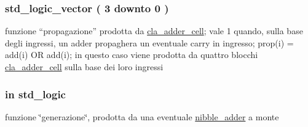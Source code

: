 \subsubsection[{\texorpdfstring{cla\+\_\+carry\+\_\+net}{cla_carry_net}}]{ {\bfseries \textcolor{vhdlchar}{ }} \hspace{0.3cm}{\ttfamily [Component]}}\hypertarget{group___nibble_adder_ga12bdc5892f526938e1447d663d152df8}{}\label{group___nibble_adder_ga12bdc5892f526938e1447d663d152df8}
\subsubsection[{\texorpdfstring{gen}{gen}}]{ {\bfseries \textcolor{vhdlchar}{std\+\_\+logic\+\_\+vector}\textcolor{vhdlchar}{ }\textcolor{vhdlchar}{(}\textcolor{vhdlchar}{ }\textcolor{vhdlchar}{ } \textcolor{vhdldigit}{3} \textcolor{vhdlchar}{ }\textcolor{vhdlchar}{downto}\textcolor{vhdlchar}{ }\textcolor{vhdlchar}{ } \textcolor{vhdldigit}{0} \textcolor{vhdlchar}{ }\textcolor{vhdlchar}{)}\textcolor{vhdlchar}{ }} \hspace{0.3cm}{\ttfamily [Signal]}}\hypertarget{group___nibble_adder_gac6c069fe4ec1c0a42272d3de4be6f45f}{}\label{group___nibble_adder_gac6c069fe4ec1c0a42272d3de4be6f45f}
funzione “propagazione” prodotta da \hyperlink{classcla__adder__cell}{cla\+\_\+adder\+\_\+cell}; vale 1 quando, sulla base degli ingressi, un adder propaghera\textquotesingle{} un eventuale carry in ingresso; prop(i) = add(i) OR add(i); in questo caso viene prodotta da quattro blocchi \hyperlink{classcla__adder__cell}{cla\+\_\+adder\+\_\+cell} sulla base dei loro ingressi 
\subsubsection[{\texorpdfstring{genin}{genin}}]{ {\bfseries \textcolor{vhdlchar}{in}\textcolor{vhdlchar}{ }} {\bfseries \textcolor{vhdlchar}{std\+\_\+logic}\textcolor{vhdlchar}{ }} \hspace{0.3cm}{\ttfamily [Port]}}\hypertarget{group___nibble_adder_ga0a46d5193cb73eb993bc5d4f69741d0a}{}\label{group___nibble_adder_ga0a46d5193cb73eb993bc5d4f69741d0a}


funzione \char`\"{}generazione\char`\"{}, prodotta da una eventuale \hyperlink{classnibble__adder}{nibble\+\_\+adder} a monte 

